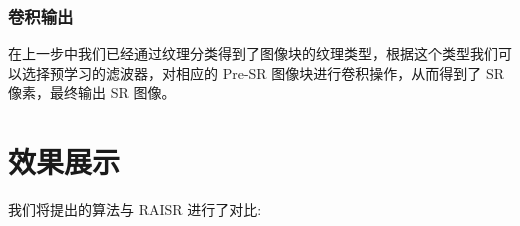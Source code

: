 \documentclass[12pt, a4paper, oneside]{ctexbook}
\begin{document}
	\subsection{卷积输出}
	在上一步中我们已经通过纹理分类得到了图像块的纹理类型，根据这个类型我们可以选择预学习的滤波器，对相应的 Pre-SR 图像块进行卷积操作，从而得到了 SR 像素，最终输出 SR 图像。
	
	\chapter{效果展示}
	我们将提出的算法与 RAISR 进行了对比:
	
	\begin{figure}[htbp]
		\centering
		\quad
\end{figure}
\end{document}
